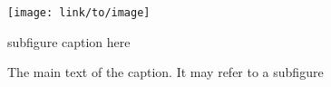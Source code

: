 \begin{figure}
        \centering
                \texttt{[image: link/to/image]}
                \caption{subfigure caption here}
        \caption{The main text of the caption. It may refer to a subfigure }
        \label{fig:forlaterref}
\end{figure}